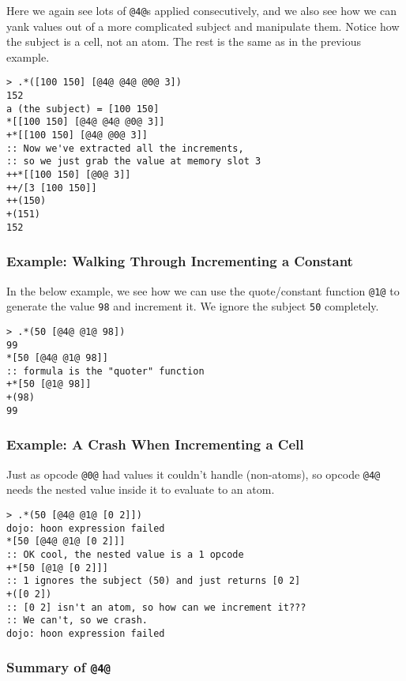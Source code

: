 \documentclass[twoside]{article}
\begin{document}
Here we again see lots of \lstinline[style=inlinecode]{@4@}s applied consecutively, and we also see how we can yank values out of a more complicated subject and manipulate them. Notice how the subject is a cell, not an atom. The rest is the same as in the previous example.

\begin{lstlisting}[style=listingcode]
> .*([100 150] [@4@ @4@ @0@ 3])
152
a (the subject) = [100 150]
*[[100 150] [@4@ @4@ @0@ 3]]
+*[[100 150] [@4@ @0@ 3]]
:: Now we've extracted all the increments,
:: so we just grab the value at memory slot 3
++*[[100 150] [@0@ 3]]
++/[3 [100 150]]
++(150)
+(151)
152
\end{lstlisting}

\subsubsection{Example:  Walking Through Incrementing a Constant}

In the below example, we see how we can use the quote/constant function \lstinline[style=inlinecode]{@1@} to generate the value \lstinline[style=inlinecode]{98} and increment it. We ignore the subject \lstinline[style=inlinecode]{50} completely.

\begin{lstlisting}[style=listingcode]
> .*(50 [@4@ @1@ 98])
99
*[50 [@4@ @1@ 98]]
:: formula is the "quoter" function
+*[50 [@1@ 98]]
+(98)
99
\end{lstlisting}

\subsubsection{Example:  A Crash When Incrementing a Cell}

Just as opcode \lstinline[style=inlinecode]{@0@} had values it couldn't handle (non-atoms), so opcode \lstinline[style=inlinecode]{@4@} needs the nested value inside it to evaluate to an atom.

\begin{lstlisting}[style=listingcode]
> .*(50 [@4@ @1@ [0 2]])
dojo: hoon expression failed
*[50 [@4@ @1@ [0 2]]]
:: OK cool, the nested value is a 1 opcode
+*[50 [@1@ [0 2]]]
:: 1 ignores the subject (50) and just returns [0 2]
+([0 2])
:: [0 2] isn't an atom, so how can we increment it???
:: We can't, so we crash.
dojo: hoon expression failed
\end{lstlisting}

\subsubsection{Summary of \lstinline[style=inlinecode]{@4@}}
\end{document}
